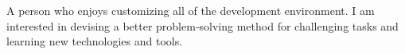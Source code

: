 
\begin{cvparagraph}

A person who enjoys customizing all of the development environment. I am interested in devising a better problem‑solving method for challenging tasks and learning new technologies and tools.
\end{cvparagraph}
